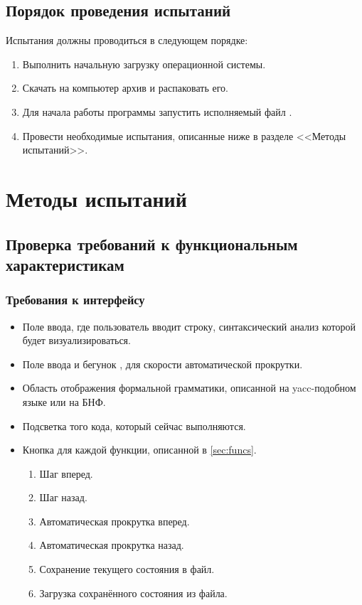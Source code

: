 \documentclass[a4paper,12pt]{article}
\begin{document}
  \subsection{Порядок проведения испытаний}
  Испытания должны проводиться в следующем порядке:
  \begin{enumerate}
    \item Выполнить начальную загрузку операционной системы.
    \item Скачать на компьютер архив \CRTzip{} и распаковать его.
    \item Для начала работы программы запустить исполняемый файл \CRTexe{}.
    \item Провести необходимые испытания, описанные ниже в разделе <<Методы испытаний>>.
  \end{enumerate}

  \newpage
  \section{Методы испытаний}
  \subsection{Проверка требований к функциональным характеристикам}
  \subsubsection{Требования к интерфейсу}
  \begin{itemize}
    \item Поле ввода, где пользователь вводит строку, синтаксический анализ которой будет визуализироваться.
    \item Поле ввода 
    и бегунок , для скорости автоматической прокрутки.
    \item Область отображения формальной грамматики, описанной на yacc-подобном языке или на БНФ. 
    \item Подсветка того кода, который сейчас выполняются. 
    \item Кнопка для каждой функции, описанной в \autoref{sec:funcs}. 
    \begin{enumerate}
      \item Шаг вперед.
      \item Шаг назад.
      \item Автоматическая прокрутка вперед.
      \item Автоматическая прокрутка назад.
      \item Сохранение текущего состояния в файл.
      \item Загрузка сохранённого состояния из файла.
    \end{enumerate}
  \end{itemize}
\end{document}
